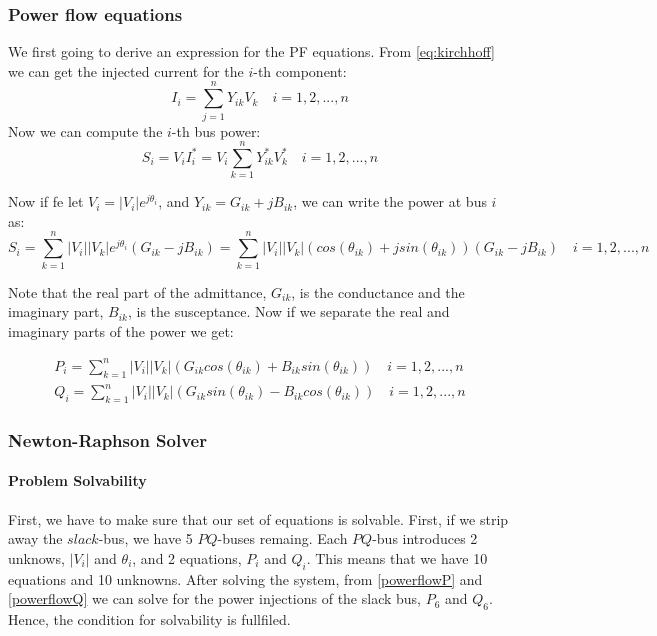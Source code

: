 \documentclass[a4paper,11pt, titlepage, twoside]{article}
\begin{document}
\subsubsection{Power flow equations}

We first going to derive an expression for the PF equations.
From \ref{eq:kirchhoff} we can get the injected current for the $i$-th component:
\begin{equation}
    I_i = \sum_{j=1}^{n} Y_{ik}V_k \quad i = 1,2,...,n
\end{equation}
Now we can compute the $i$-th bus power:
\begin{equation}
    S_i = V_iI_i^* = V_i\sum_{k=1}^{n} Y_{ik}^*V_k^* \quad i = 1,2,...,n
\end{equation}

Now if fe let $V_i = |V_i|e^{j\theta_i}$, and $Y_{ik} = G_{ik} + jB_{ik}$, we can write the power at bus $i$ as:
\begin{equation}
    S_i = \sum_{k=1}^n|V_i||V_k|e^{j\theta_i}(G_{ik} - jB_{ik}) = \sum_{k=1}^n|V_i||V_k|(cos(\theta_{ik})+jsin(\theta_{ik}))(G_{ik} - jB_{ik}) \quad i = 1,2,...,n
\end{equation}

Note that the real part of the admittance, $G_{ik}$, is the conductance and the imaginary part, $B_{ik}$, is the susceptance. Now if we separate the real and imaginary parts of the power we get:

\begin{align}
    P_i= \sum_{k=1}^n|V_i||V_k|(G_{ik}cos(\theta_{ik}) + B_{ik}sin(\theta_{ik}))\label{powerflowP} \quad i= 1,2,...,n \\
    Q_i= \sum_{k=1}^n|V_i||V_k|(G_{ik}sin(\theta_{ik}) - B_{ik}cos(\theta_{ik}))\label{powerflowQ} \quad i= 1,2,...,n
\end{align}  


\subsubsection{Newton-Raphson Solver}\label{NRsolver}

\paragraph{Problem Solvability}

First, we have to make sure that our set of equations is solvable. First, if we strip away the $slack$-bus, we have 5 $PQ$-buses remaing. Each $PQ$-bus introduces 2 unknows, $|V_i|$ and $\theta_i$, and 2 equations, $P_i$ and $Q_i$. This means that we have 10 equations and 10 unknowns. 
After solving the system, from \ref{powerflowP} and \ref{powerflowQ} we can solve for the power injections of the slack bus, $P_6$ and $Q_6$. Hence, the condition for solvability is fullfiled.
\end{document}
